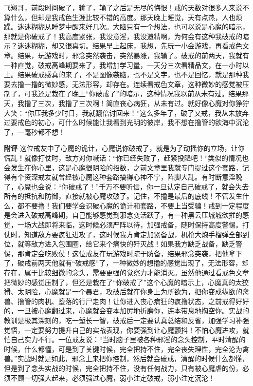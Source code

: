 \begin{case}
    飞翔哥，前段时间破了，输了，输了之后是无尽的悔恨！戒的天数对很多人来说不算什么，但却是我戒色生涯比较不错的高度。那天晚上睡觉，天有点热，人也烦躁。迷迷糊糊从睡梦中醒来好几次。大脑只有一个想法，也可以说是心魔的暗示，那就是你破戒了！我高度紧张，我没意淫，我没遗精啊，为何会有这种我破戒的暗示？迷迷糊糊，却又很真切。结果早上起床，我想，先玩一小会游戏，再看戒色文章。结果，玩游戏时，邪念突然袭击，突然暴涨，我输了。破戒的前两天，我就有一种直觉，破戒高峰期要来了，我增加学习量，一天分三次看精品文，在一小时以上。结果破戒感真的来了，不是图像袭脑，也不是文字，也不是回忆，就是那种我要去撸一撸的微妙感，无法形容，却存在。连续看戒色文章，这种微妙的感觉被压制了，可我还是栽在了晚上“你破戒了”的暗示，这种情况我以前从未有过。结果那天，我撸了三次，我撸了三次啊！简直丧心病狂，从未有过。就好像心魔对你狰狞大笑：“你压我多少时日，我就翻倍讨回来！”这么多年了，破了又戒，我从未放弃过要戒色的初心，可什么时候能让我看到光明的彼岸，我不想在撸管的欲海中沉沦了，一毫秒都不想！

    \textbf{附评} 这位戒友中了心魔的诡计，心魔说你破戒了，就是为了动摇你的立场，让你慌乱！就像打仗时，敌方对你喊话：“你已经失败了，赶紧投降吧！”类似的情况也会发生在你心里，这是心魔很阴险的招数，之前文章里我就专门提过这个套路，记得有个资深戒友就曾经被心魔这种套路搞得心神不宁，阵脚大乱。有时断意淫晚了，心魔也会说：“你破戒了！”千万不要听信，你一旦认定自己破戒了，就会失去所有的抵抗和防御，直接就被心魔攻破了。记住，不撸是最后的底线！不管发生什么，都不要撸！我们要学会识破心魔的诡计和套路，不要上当受骗！戒到一定程度是会进入破戒高峰期，自己能够感觉到邪念变活跃了，有一种黑云压城城欲摧的感觉，一场大战即将来临，这时候必须严阵以待，加强戒备，随时保持高度警惕。打仗时，知道敌方要疯狂进攻了，这时候我方肯定加紧备战，机枪大炮手榴弹全部到位，就等敌方进入包围圈，给它来个痛快的歼灭战！如果我方缺乏战备，缺乏警惕，那肯定会吃败仗！这位戒友在玩游戏时疏于防备，结果邪念突袭，把他拿下了，破戒前两天他就有“破戒感”了，一种微妙的想撸的感觉出现了，无法形容，却存在，属于比较细微的念头，需要更强的觉察力才能消灭。虽然他通过看戒色文章把微妙的感觉压制了，但还是栽在了“你破戒了”这个心魔的暗示上，心魔真的太狡猾、太阴险，心魔就是一个暴君，攻破后就在你身上为所欲为，把你变成纵欲的禽兽、撸管的肉机、堕落的行尸走肉！让你进入丧心病狂的疯撸状态，之前戒得好好的，一旦被心魔翻过来，心魔就会变本加厉地折磨你，连本带息地掏空你。实战的教训是极其深刻的，吃一堑长一智，破戒后一定要认真总结和反省，加强学习补强觉悟，一定要努力提升自己的实战表现，你要强到让心魔颤抖！不怕心魔进攻，就怕自己实力不行。一位戒友说：“当时脑子里被各种邪淫的念头控制，平时清醒的时候，什么都懂，可是到了关键时候，完全把持不住，完全丧失理性，完全沦为禽兽。”实战时就是如此，邪念上来把你控制，然后就会破戒，清醒的时候什么都懂，但是到了念头实战的时候，完全把持不住，没有任何战力，只有被心魔虐的份，必须不顾一切强大起来，必须强过心魔，弱小注定破戒，弱小注定沉沦！
\end{case}

